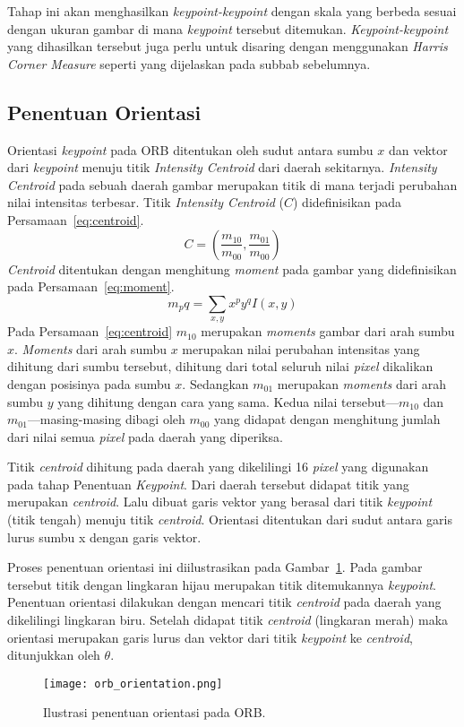 Tahap ini akan menghasilkan \textit{keypoint-keypoint} dengan skala yang berbeda sesuai dengan ukuran gambar di mana \textit{keypoint} tersebut ditemukan. \textit{Keypoint-keypoint} yang dihasilkan tersebut juga perlu untuk disaring dengan menggunakan \textit{Harris Corner Measure} seperti yang dijelaskan pada subbab sebelumnya. 

\subsection{Penentuan Orientasi}
\label{subsec:orb_orientasi}
Orientasi \textit{keypoint} pada ORB ditentukan oleh sudut antara sumbu $x$ dan vektor dari \textit{keypoint} menuju titik \textit{Intensity Centroid} dari daerah sekitarnya. \textit{Intensity Centroid} pada sebuah daerah gambar merupakan titik di mana terjadi perubahan nilai intensitas terbesar. Titik \textit{Intensity Centroid} ($C$) didefinisikan pada Persamaan~\ref{eq:centroid}.
\begin{equation}
	C=(\frac{m_{10}}{m_{00}}, \frac{m_{01}}{m_{00}})
	\label{eq:centroid}
\end{equation}
\textit{Centroid} ditentukan dengan menghitung \textit{moment} pada gambar yang didefinisikan pada Persamaan~\ref{eq:moment}.
\begin{equation}
	m_pq=\sum_{x,y}x^py^qI(x,y)
	\label{eq:moment}
\end{equation}
Pada Persamaan~\ref{eq:centroid} $m_{10}$ merupakan \textit{moments} gambar dari arah sumbu $x$. \textit{Moments} dari arah sumbu $x$ merupakan nilai perubahan intensitas yang dihitung dari sumbu tersebut, dihitung dari total seluruh nilai \textit{pixel} dikalikan dengan posisinya pada sumbu $x$. Sedangkan $m_{01}$ merupakan \textit{moments} dari arah sumbu $y$ yang dihitung dengan cara yang sama. Kedua nilai tersebut---$m_{10}$ dan $m_{01}$---masing-masing dibagi oleh $m_{00}$ yang didapat dengan menghitung jumlah dari nilai semua \textit{pixel} pada daerah yang diperiksa.

Titik \textit{centroid} dihitung pada daerah yang dikelilingi 16 \textit{pixel} yang digunakan pada tahap Penentuan \textit{Keypoint}. Dari daerah tersebut didapat titik yang merupakan \textit{centroid}. Lalu dibuat garis vektor yang berasal dari titik \textit{keypoint} (titik tengah) menuju titik \textit{centroid}. Orientasi ditentukan dari sudut antara garis lurus sumbu x dengan garis vektor.

Proses penentuan orientasi ini diilustrasikan pada Gambar~\ref{fig:orb_orientation}. Pada gambar tersebut titik dengan lingkaran hijau merupakan titik ditemukannya \textit{keypoint}. Penentuan orientasi dilakukan dengan mencari titik \textit{centroid} pada daerah yang dikelilingi lingkaran biru. Setelah didapat titik \textit{centroid} (lingkaran merah) maka orientasi merupakan garis lurus dan vektor dari titik \textit{keypoint} ke \textit{centroid}, ditunjukkan oleh $\theta$.
\begin{figure}[H]
	\centering
	\texttt{[image: orb\_orientation.png]}
	\caption{Ilustrasi penentuan orientasi pada ORB.}
	\label{fig:orb_orientation}
\end{figure}

